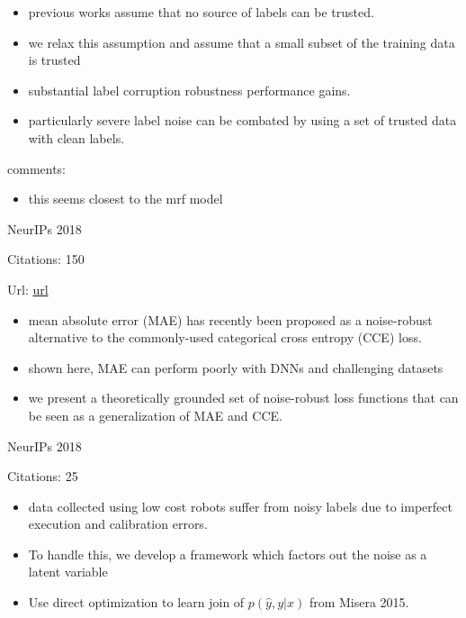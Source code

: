 \documentclass[11pt]{article}
\begin{document}
\begin{itemize}
\item previous works assume that no source of labels can be trusted. 
\item we relax this assumption and assume that a small subset of the training data is trusted
\item substantial label corruption robustness performance gains.
\item particularly severe label noise can be combated by using a set of trusted data with clean labels.
\end{itemize}

\noindent comments:
\begin{itemize}
\item this seems closest to the mrf model
\end{itemize}

\vspace{2cm}

\noindent NeurIPs 2018

\noindent Citations: 150

\noindent Url: \href{https://papers.nips.cc/paper/8094-generalized-cross-entropy-loss-for-training-deep-neural-networks-with-noisy-labels.pdf}{url}

\begin{itemize}
\item mean absolute error (MAE) has recently been proposed as a noise-robust alternative to the commonly-used categorical cross entropy (CCE) loss.
\item shown here, MAE can perform poorly with DNNs and challenging datasets
\item we present a theoretically grounded set of noise-robust loss functions that can be seen as a generalization of MAE and CCE.
\end{itemize}

\vspace{2cm}

\noindent NeurIPs 2018

\noindent Citations: 25

\begin{itemize}
\item data collected using low cost robots suffer from noisy labels due to imperfect execution and calibration errors.
\item To handle this, we develop a framework which factors out the noise as a latent variable
\item Use direct optimization to learn join of $p(\hat{y},y|x)$ from Misera 2015.
\end{itemize}
\end{document}
